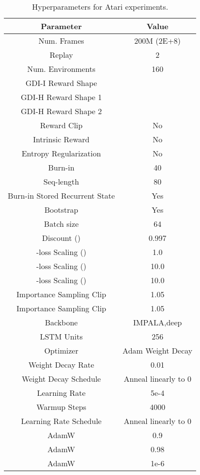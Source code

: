 \documentclass[nohyperref]{article}
\theoremstyle{plain}
\begin{document}
\begin{table}[H]
\begin{center}
\caption{Hyperparameters for Atari experiments.}
\label{tab:fixed_model_hyperparameters_atari}
\begin{tabular}{|c|c|}
\hline
\textbf{Parameter} & \textbf{Value}  \\
\hline
Num. Frames & 200M (2E+8) \\
\hline
Replay & 2 \\
\hline
Num. Environments & 160 \\
\hline
GDI-I Reward Shape &  \\
\hline
GDI-H Reward Shape 1 &  \\
\hline
GDI-H Reward Shape 2 &  \\
\hline
Reward Clip & No \\
\hline
Intrinsic Reward & No \\
\hline
Entropy Regularization & No \\
\hline
Burn-in & 40 \\
\hline
Seq-length & 80 \\
\hline
Burn-in Stored Recurrent State & Yes \\
\hline
Bootstrap & Yes \\
\hline
Batch size & 64 \\
\hline
Discount () & 0.997 \\
\hline
-loss Scaling () & 1.0 \\
\hline
-loss Scaling () & 10.0 \\
\hline
-loss Scaling () & 10.0 \\
\hline
Importance Sampling Clip  & 1.05 \\
\hline
Importance Sampling Clip  & 1.05 \\
\hline
Backbone & IMPALA,deep \\
\hline
LSTM Units & 256 \\
\hline
Optimizer & Adam Weight Decay \\
\hline
Weight Decay Rate & 0.01 \\
\hline
Weight Decay Schedule & Anneal linearly to 0 \\
\hline
Learning Rate & 5e-4 \\
\hline
Warmup Steps & 4000 \\
\hline
Learning Rate Schedule & Anneal linearly to 0 \\
\hline
AdamW  & 0.9 \\
\hline
AdamW  & 0.98 \\
\hline
AdamW  & 1e-6 \\

\end{tabular}
\end{center}
\end{table}
\end{document}
